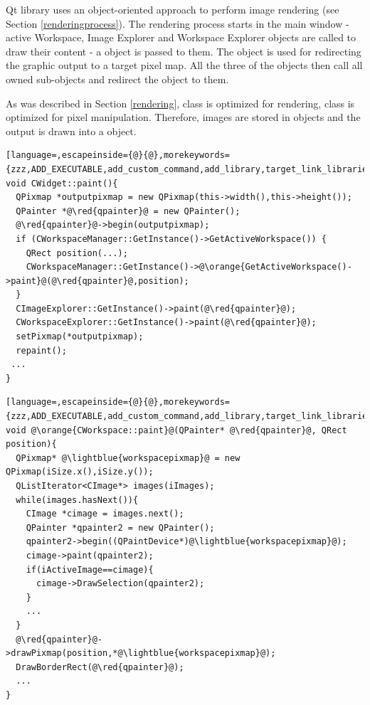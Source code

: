 Qt library uses an object-oriented approach to perform image rendering (see Section \ref{renderingprocess}). The rendering process starts in the main window - active Workspace, Image Explorer and Workspace Explorer objects are called to draw their content - a  object is passed to them. The  object is used for redirecting the graphic output to a target pixel map. All the three of the objects then call all owned sub-objects and redirect the  object to them.

As was described in Section \ref{rendering},  class is optimized for rendering,  class is optimized for pixel manipulation. Therefore, images are stored in  objects and the output is drawn into a  object.

\begin{lstlisting}[language=,escapeinside={@}{@},morekeywords={zzz,ADD_EXECUTABLE,add_custom_command,add_library,target_link_libraries,OUTPUT,COMMAND,xxx})]
void CWidget::paint(){
  QPixmap *outputpixmap = new QPixmap(this->width(),this->height());
  QPainter *@\red{qpainter}@ = new QPainter();
  @\red{qpainter}@->begin(outputpixmap);
  if (CWorkspaceManager::GetInstance()->GetActiveWorkspace()) {
    QRect position(...);
    CWorkspaceManager::GetInstance()->@\orange{GetActiveWorkspace()->paint}@(@\red{qpainter}@,position);
  }
  CImageExplorer::GetInstance()->paint(@\red{qpainter}@);
  CWorkspaceExplorer::GetInstance()->paint(@\red{qpainter}@);
  setPixmap(*outputpixmap);
  repaint(); 
 ...
}
\end{lstlisting}

\begin{lstlisting}[language=,escapeinside={@}{@},morekeywords={zzz,ADD_EXECUTABLE,add_custom_command,add_library,target_link_libraries,OUTPUT,COMMAND,xxx})]
void @\orange{CWorkspace::paint}@(QPainter* @\red{qpainter}@, QRect position){
  QPixmap* @\lightblue{workspacepixmap}@ = new QPixmap(iSize.x(),iSize.y());
  QListIterator<CImage*> images(iImages);
  while(images.hasNext()){
    CImage *cimage = images.next();
    QPainter *qpainter2 = new QPainter();
    qpainter2->begin((QPaintDevice*)@\lightblue{workspacepixmap}@);
    cimage->paint(qpainter2);
    if(iActiveImage==cimage){
      cimage->DrawSelection(qpainter2);
    }
    ...
  }
  @\red{qpainter}@->drawPixmap(position,*@\lightblue{workspacepixmap}@);
  DrawBorderRect(@\red{qpainter}@);
  ...
}
\end{lstlisting}